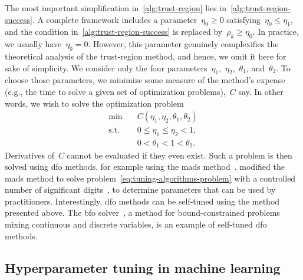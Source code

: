 The most important simplification in~\cref{alg:trust-region} lies in~\cref{alg:trust-region-success}.
A complete framework includes a parameter~$\eta_0 \ge 0$ satisfying~$\eta_0 \le \eta_1$, and the condition in~\cref{alg:trust-region-success} is replaced by~$\rho_k \ge \eta_0$.
In practice, we usually have~$\eta_0 = 0$.
However, this parameter genuinely complexifies the theoretical analysis of the trust-region method, and hence, we omit it here for sake of simplicity.
We consider only the four parameters~$\eta_1$,~$\eta_2$,~$\theta_1$, and~$\theta_2$.
To choose those parameters, we minimize some measure of the method's expense (e.g., the  time to solve a given set of optimization problems),~$C$ say.
In other words, we wish to solve the optimization problem
\begin{subequations}
    \label{eq:tuning-algorithms-problem}
    \begin{align}
        \min        & \quad C(\eta_1, \eta_2, \theta_1, \theta_2)\\
        \text{s.t.} & \quad 0 \le \eta_1 \le \eta_2 < 1,\\
                    & \quad 0 < \theta_1 < 1 < \theta_2.
    \end{align}
\end{subequations}
Derivatives of~$C$ cannot be evaluated if they even exist.
Such a problem is then solved using \gls{dfo} methods, for example using the \gls{mads} method~\cite{Audet_Orban_2006}.
 modified the \gls{mads} method to solve problem~\cref{eq:tuning-algorithms-problem} with a controlled number of significant digits~\cite{Audet_Digabel_Tribes_2019}, to determine parameters that can be used by practitioners.
Interestingly, \gls{dfo} methods can be self-tuned using the method presented above.
The \gls{bfo} solver~\cite{Porcelli_Toint_2017}, a method for bound-constrained problems mixing continuous and discrete variables, is an example of self-tuned \gls{dfo} methods.

\subsection{Hyperparameter tuning in machine learning}
\label{subsec:machine-learning}

